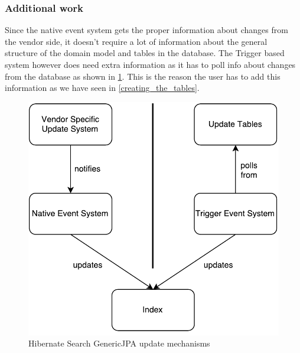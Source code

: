 \subsubsection{Additional work}
Since the native event system gets the proper information about changes from the vendor side, it doesn't require a lot of information about the general structure of the domain model and tables in the database. The Trigger based system however does need extra information as it has to poll info about changes from the database as shown in \ref{updateconsumer_architecture}. This is the reason the user has to add this information as we have seen in \ref{creating_the_tables}.
\\
\begin{figure}[ht]
	\centering
	\includegraphics[scale=0.6]{images/UpdateConsumer_Architecture.pdf}
	\caption{Hibernate Search GenericJPA update mechanisms}
	\label{updateconsumer_architecture}
\end{figure}

\pagebreak

